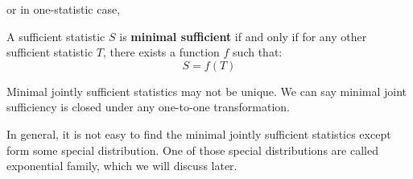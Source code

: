 \documentclass{huhtakm-template-book-v2}
\begin{document}
or in one-statistic case,
\begin{defn}
	A sufficient statistic $S$ is \textbf{minimal sufficient} if and only if for any other sufficient statistic $T$, there exists a function $f$ such that:
	\begin{equation*}
		S=f(T)
	\end{equation*}
\end{defn}
\begin{rem}
	Minimal jointly sufficient statistics may not be unique. We can say minimal joint sufficiency is closed under any one-to-one transformation.
\end{rem}
In general, it is not easy to find the minimal jointly sufficient statistics except form some special distribution. One of those special distributions are called exponential family, which we will discuss later.

\newpage
\end{document}
